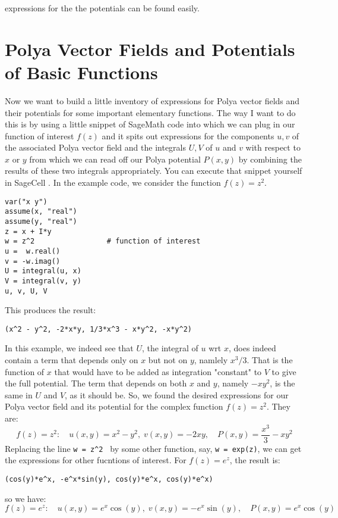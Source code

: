 \documentclass[12pt]{article}
\begin{document}
expressions for the the potentials can be found easily.

\section{Polya Vector Fields and Potentials of Basic Functions}
Now we want to build a little inventory of expressions for Polya vector fields and their potentials for some important elementary functions. The way I want to do this is by using a little snippet of SageMath code into which we can plug in our function of interest $f(z)$ and it spits out expressions for the components $u,v$ of the associated Polya vector field and the integrals $U,V$ of $u$ and $v$ with respect to $x$ or $y$ from which we can read off our Polya potential $P(x,y)$ by combining the results of these two integrals appropriately. You can execute that snippet yourself in SageCell \cite{SageCell}. In the example code, we consider the function $f(z) = z^2$.
\begin{verbatim}
var("x y")
assume(x, "real")
assume(y, "real")
z = x + I*y
w = z^2                 # function of interest
u =  w.real() 
v = -w.imag()
U = integral(u, x)
V = integral(v, y)
u, v, U, V	
\end{verbatim}
This produces the result:
\begin{verbatim}
(x^2 - y^2, -2*x*y, 1/3*x^3 - x*y^2, -x*y^2)
\end{verbatim}
In this example, we indeed see that $U$, the integral of $u$ wrt $x$, does indeed contain a term that depends only on $x$ but not on $y$, namlely $x^3/3$. That is the function of $x$ that would have to be added as integration "constant" to $V$ to give the full potential. The term that depends on both $x$ and $y$, namely $-x y^2$, is the same in $U$ and $V$, as it should be. So, we found the desired expressions for our Polya vector field and its potential for the complex function $f(z) = z^2$. They are:
\begin{equation}
f(z) = z^2: \quad 
u(x,y) = x^2 - y^2, \; 
v(x,y) = -2 x y, \quad 
P(x,y) = \frac{x^3}{3} -x y^2
\end{equation}
Replacing the line \texttt{w = z\textasciicircum2 } by some other function, say, \texttt{w = exp(z)}, we can get the expressions for other fucntions of interest. For $f(z) = e^z$, the result is:
\begin{verbatim}
(cos(y)*e^x, -e^x*sin(y), cos(y)*e^x, cos(y)*e^x)
\end{verbatim}
so we have:
\begin{equation}
f(z) = e^z: \quad 
u(x,y) =  e^x \cos(y), \; 
v(x,y) = -e^x \sin(y), \quad 
P(x,y) =  e^x \cos(y)
\end{equation}
\end{document}
